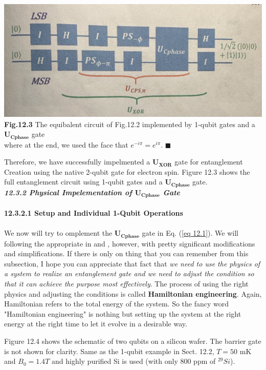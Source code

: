 \documentclass{article}
\newcommand{\bfit}[1]{\textit{\textbf{#1}}}
\begin{document}
\includegraphics[scale=0.45]{Fig.12.3.jpeg}\\
\textbf{Fig.12.3} The equibalent circuit of Fig.12.2 implemented by 1-qubit gates and a $\boldsymbol{U_{Cphase}}$ gate
\\[10pt]
where at the end, we used the face that $e^{-i\pi}=e^{i\pi}$. \hfill $\blacksquare$

Therefore, we have successfully impelmented a $\boldsymbol{U_{XOR}}$ gate for entanglement Creation
using the native 2-qubit gate for electron spin. Figure 12.3 shows the full entanglement circuit using
1-qubit gates and a $\boldsymbol{U_{Cphase}}$ gate.
\\[30pt]
\bfit{\large 12.3.2 Physical Impelementation of $\boldsymbol{U_{Cphase}}$ Gate}
\\\\
\textbf{12.3.2.1 Setup and Individual 1-Qubit Operations}\\\\
We now will try to omplement the $\boldsymbol{U_{Cphase}}$ gate in Eq. (\ref{eq 12.1}). We will following
the appropriate in \cite{meunier2011efficient} and \cite{veldhorst2015two}, however, with pretty significant
modifications and simplifications. If there is only on thing that you can remember from this subsection, I hope 
you can appreciate that fact that \textit{we need to use the physics of a system to realize an entanglement gate and we need to adjust the condition so
that it can achieve the purpose most effectively}. The process of using the right physics and adjusting the conditions
is called \textbf{Hamiltonian engineering}. Again, Hamiltonian refers to the total energy of the system. So the fancy
word "Hamiltonian engineering" is nothing but setting up the system at the right energy at the right time to let it evolve
in a desirable way.

Figure 12.4 shows the schematic of two qubits on a silicon wafer. The barrier gate is not shown for
clarity. Same as the 1-qubit example in Sect. 12.2, $T=50$ mK and $B_0=1.4T$ and highly purified Si is used 
(with only 800 ppm of $^{29}Si$).
\end{document}
